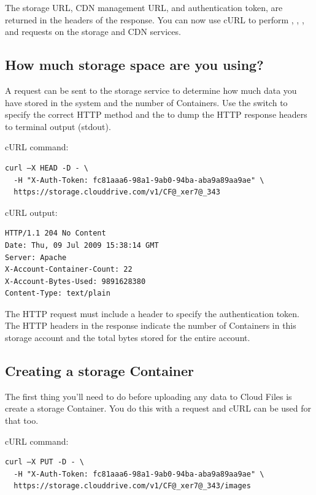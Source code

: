\documentclass[letterpaper,10pt,english]{manual}
\begin{document}
The storage URL, CDN management URL, and authentication token,
are returned in the headers of the response. You can now use cURL to
perform , , ,  and  requests on
the storage and CDN services.


\subsection{How much storage space are you using?}

A  request can be sent to the storage service to determine how
much data you have stored in the system and the number of Containers.
Use the  switch to specify the correct HTTP method and the 
to dump the HTTP response headers to terminal output (stdout).

cURL command:

\begin{Verbatim}[commandchars=@\[\]]
curl –X HEAD -D - \
  -H "X-Auth-Token: fc81aaa6-98a1-9ab0-94ba-aba9a89aa9ae" \
  https://storage.clouddrive.com/v1/CF@_xer7@_343
\end{Verbatim}

cURL output:

\begin{Verbatim}[commandchars=@\[\]]
HTTP/1.1 204 No Content
Date: Thu, 09 Jul 2009 15:38:14 GMT
Server: Apache
X-Account-Container-Count: 22
X-Account-Bytes-Used: 9891628380
Content-Type: text/plain
\end{Verbatim}

The HTTP request must include a header to specify the authentication
token.  The HTTP headers in the response indicate the number of Containers
in this storage account and the total bytes stored for the entire account.


\subsection{Creating a storage Container}

The first thing you'll need to do before uploading any data to Cloud
Files is create a storage Container.  You do this with a  request
and cURL can be used for that too.

cURL command:

\begin{Verbatim}[commandchars=@\[\]]
curl –X PUT -D - \
  -H "X-Auth-Token: fc81aaa6-98a1-9ab0-94ba-aba9a89aa9ae" \
  https://storage.clouddrive.com/v1/CF@_xer7@_343/images
\end{Verbatim}
\end{document}
